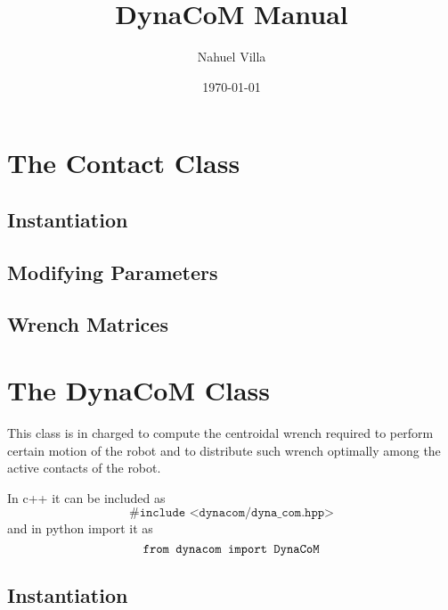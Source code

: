 \documentclass[12pt]{article}
\title{DynaCoM Manual}
\author{Nahuel Villa}
\date{\today}
\begin{document}
\maketitle{}

\tableofcontents

\clearpage
\newpage

\section{The Contact Class}

\subsection{Instantiation}
\hrulefill



\clearpage

\subsection{Modifying Parameters}
\hrulefill



\clearpage

\subsection{Wrench Matrices}
\hrulefill




\clearpage

\section{The DynaCoM Class}

    This class is in charged to compute the centroidal wrench required to perform certain motion of the robot and to distribute such wrench optimally among the active contacts of the robot.

    In c++ it can be included as 
    \begin{equation*}
    \texttt{\#include <dynacom/dyna\_com.hpp>}
    \end{equation*}
    and in python import it as
    \begin{equation*}
    \texttt{\texttt{from dynacom import DynaCoM}}
    \end{equation*}

\subsection{Instantiation}
\hrulefill
\end{document}
